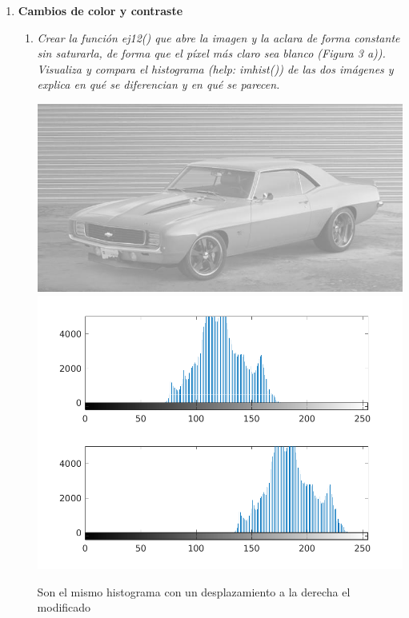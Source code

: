 \documentclass[a4paper,10pt]{article}
\begin{document}
\begin{enumerate}
\begin{enumerate}
 \end{enumerate}

\newpage

 \item \textbf{Cambios de color y contraste}
 
 \begin{enumerate}
 \item \textit{Crear la función ej12() que abre la imagen y la aclara de forma constante sin saturarla, de forma que el píxel más claro sea blanco (Figura 3 a)). Visualiza y compara el histograma (help: imhist()) de las dos imágenes y explica en qué se diferencian y en qué se parecen.}

 \begin{center}
 \includegraphics[scale=0.4]{car_bright} 
 \includegraphics[scale=0.6]{subplot_2_high}
 \end{center}

 Son el mismo histograma con un desplazamiento a la derecha el modificado


\end{enumerate}
\end{enumerate}
\end{document}
